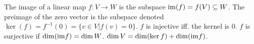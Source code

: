  The image of a linear map $f : V \to W$ is the subspace $\text{im}(f) = f(V) \subseteq W$. The preimage of the zero vector is the subspace denoted $\ker(f) = f^{-1}(0) = \{v \in V | f(v)=0\}$.
 $f$ is injective iff. the kernel is 0. $f$ is surjective if $\dim(\text{im} f) = \dim W$.
 $\dim V = \dim(\ker f) + \dim(\text{im} f)$.
